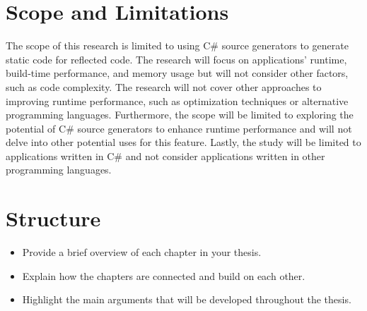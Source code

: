 \section{Scope and Limitations}

The scope of this research is limited to using C\# source generators to generate static code for reflected code. The research will focus on applications' runtime, build-time performance, and memory usage but will not consider other factors, such as code complexity. The research will not cover other approaches to improving runtime performance, such as optimization techniques or alternative programming languages. Furthermore, the scope will be limited to exploring the potential of C\# source generators to enhance runtime performance and will not delve into other potential uses for this feature. Lastly, the study will be limited to applications written in C\# and not consider applications written in other programming languages.

\section{Structure}

\begin{itemize}
    \item Provide a brief overview of each chapter in your thesis.
    \item Explain how the chapters are connected and build on each other.
    \item Highlight the main arguments that will be developed throughout the thesis.
\end{itemize}